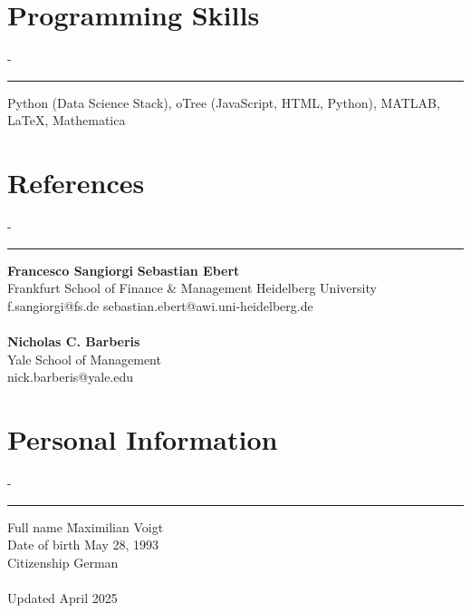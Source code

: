 \documentclass{res}
\newcommand{\sectionline}{	\vspace{-8pt}
	{\parindent-\sectionwidth \rule{\resumewidth}{0.4pt}} }
\newenvironment{nstabbing}
  {\setlength{\topsep}{-\parskip}%
   \setlength{\partopsep}{0pt}%
   \tabbing}
  {\endtabbing}
\begin{document}
\begin{resume}
\section{Programming Skills}
	\sectionline
	\vspace{-3ex}
	\begin{nstabbing}
	Python (Data Science Stack), oTree (JavaScript, HTML, Python), MATLAB, \LaTeX, Mathematica
	\end{nstabbing}

\section{References}
	\sectionline
	\vspace{-3ex}
	\begin{nstabbing}
		\textbf{Francesco Sangiorgi} \hspace{12em} \= \textbf{Sebastian Ebert} \\
		Frankfurt School of Finance \& Management \> Heidelberg University \\
		f.sangiorgi@fs.de \> sebastian.ebert@awi.uni-heidelberg.de  \\
		\\
		\textbf{Nicholas C. Barberis}  \\
		Yale School of Management  \\
		nick.barberis@yale.edu
	\end{nstabbing}

\section{Personal Information}
	\sectionline
	\vspace{-3ex}
	\begin{nstabbing}
		Full name \qquad \= Maximilian Voigt \\
		Date of birth  \> May 28, 1993 \\
		Citizenship  \> German \\
		\\
		Updated \> April 2025
	\end{nstabbing} 

\end{resume}
\end{document}
